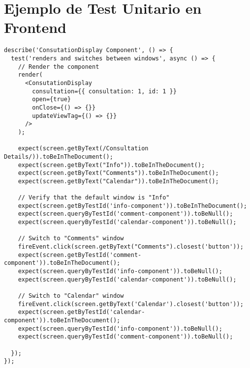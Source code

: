 \section{Ejemplo de Test Unitario en Frontend}\label{sec:apendix-unitest-2}

\begin{lstlisting}[caption={Test Unitario Frontend}, label={cod:python}, captionpos=b]
describe('ConsutationDisplay Component', () => {
  test('renders and switches between windows', async () => {
    // Render the component
    render(
      <ConsutationDisplay
        consultation={{ consultation: 1, id: 1 }}
        open={true}
        onClose={() => {}}
        updateViewTag={() => {}}
      />
    );

    expect(screen.getByText(/Consultation Details/)).toBeInTheDocument();
    expect(screen.getByText("Info")).toBeInTheDocument();
    expect(screen.getByText("Comments")).toBeInTheDocument();
    expect(screen.getByText("Calendar")).toBeInTheDocument();

    // Verify that the default window is "Info"
    expect(screen.getByTestId('info-component')).toBeInTheDocument();
    expect(screen.queryByTestId('comment-component')).toBeNull();
    expect(screen.queryByTestId('calendar-component')).toBeNull();

    // Switch to "Comments" window
    fireEvent.click(screen.getByText("Comments").closest('button'));
    expect(screen.getByTestId('comment-component')).toBeInTheDocument();
    expect(screen.queryByTestId('info-component')).toBeNull();
    expect(screen.queryByTestId('calendar-component')).toBeNull();

    // Switch to "Calendar" window
    fireEvent.click(screen.getByText('Calendar').closest('button'));
    expect(screen.getByTestId('calendar-component')).toBeInTheDocument();
    expect(screen.queryByTestId('info-component')).toBeNull();
    expect(screen.queryByTestId('comment-component')).toBeNull();

  });
});
\end{lstlisting}